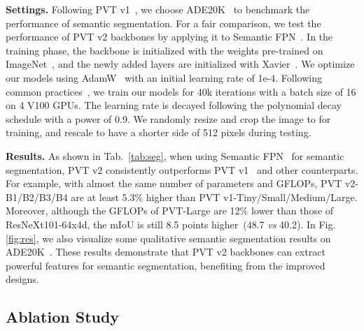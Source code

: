 \documentclass[10pt,twocolumn,letterpaper]{article}
\begin{document}
	\noindent\textbf{Settings.}
	Following PVT v1~\cite{pvt}, we choose ADE20K~\cite{zhou2017scene} to benchmark the performance of semantic segmentation.
For a fair comparison, we test the performance of PVT v2 backbones by applying it to Semantic FPN~\cite{kirillov2019panoptic}.
	In the training phase, the backbone is initialized with the weights pre-trained on ImageNet~\cite{deng2009imagenet}, and the newly added layers are initialized with Xavier~\cite{glorot2010understanding}. 
	We optimize our models using AdamW~\cite{loshchilov2017decoupled} with an initial learning rate of 1e-4.
	Following common practices~\cite{kirillov2019panoptic,chen2017deeplab}, we train our models for 40k iterations with a batch size of 16 on 4 V100 GPUs.
	The learning rate is decayed following the polynomial decay schedule with a power of 0.9.
	We randomly resize and crop the image to  for training, and rescale to have a shorter side of 512 pixels during testing.
	
	
	\begin{figure*}[t]
		\centering
		\setlength{\fboxrule}{0pt}
		\caption{\textbf{Qualitative results of object detection and instance segmentation on COCO \texttt{val2017}~\cite{lin2014microsoft}, and semantic segmentation on ADE20K~\cite{zhou2017scene}.} The results (from left to right) are generated by PVT v2-B2-based RetinaNet~\cite{lin2017focal}, Mask R-CNN~\cite{he2017mask}, and Semantic FPN~\cite{kirillov2019panoptic}, respectively.}
		\label{fig:res}
	\end{figure*}
	
	\noindent\textbf{Results.} 
	As shown in Tab.~\ref{tab:seg}, when using Semantic FPN~\cite{kirillov2019panoptic} for semantic segmentation, PVT v2 consistently outperforms PVT v1~\cite{pvt} and other counterparts.
	For example, with almost the same number of parameters and GFLOPs, PVT v2-B1/B2/B3/B4 are at least 5.3\% higher than PVT v1-Tiny/Small/Medium/Large. 
	Moreover, although the GFLOPs of PVT-Large are 12\% lower than those of ResNeXt101-64x4d, the mIoU is still 8.5 points higher~(48.7 \textit{vs} 40.2).
	In Fig. \ref{fig:res}, we also visualize some qualitative semantic segmentation results on ADE20K~\cite{zhou2017scene}.
	These results demonstrate that PVT v2 backbones can extract powerful features for semantic segmentation, benefiting from the improved designs.
	
	\subsection{Ablation Study}
	
\end{document}
